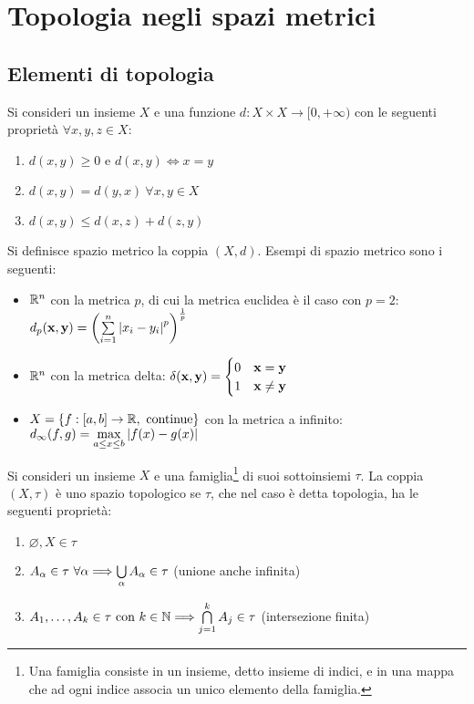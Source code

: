 \chapter{Topologia negli spazi metrici}\label{chap:topology}

\section{Elementi di topologia}

\begin{definition}\label{def:distance}
    Si consideri un insieme $X$ e una funzione $d: X\times X \to [0, +\infty)$ con le seguenti proprietà $\forall x,y,z \in X$:
    \begin{enumerate}
        \item $d(x,y) \geq 0$ e $d(x,y) \iff  x = y$
        \item $d(x,y) = d(y,x) \  \forall x, y \in X$
        \item $d(x,y) \leq d(x,z) + d(z,y)$
    \end{enumerate}
    Si definisce spazio metrico la coppia $(X, d)$. Esempi di spazio metrico sono i seguenti:
    \begin{itemize}
        \item $\mathbb{R}^n$ con la metrica $p$, di cui la metrica euclidea è il caso con $p=2$: $d_p(\vb{x},\vb{y})=\left(\sum\limits_{i=1}^n \abs{x_i-y_i}^p\right)^{\frac{1}{p}}$
        \item $\mathbb{R}^n$ con la metrica delta: $\delta(\vb{x},\vb{y})=\begin{cases}
            0 &\vb{x}=\vb{y}\\
            1 &\vb{x}\neq\vb{y}
        \end{cases}$
        \item $X=\{f:[a,b]\to\mathbb{R}, \text{ continue}\}$ con la metrica a infinito: $d_\infty(f,g)=\max\limits_{a\leq x\leq b}\abs{f(x)-g(x)}$
    \end{itemize}
\end{definition}

\begin{definition}[Topologia]
    Si consideri un insieme $X$ e una famiglia\footnote{Una famiglia consiste in un insieme, detto insieme di indici, e in una mappa che ad ogni indice associa un unico elemento della famiglia.} di suoi sottoinsiemi $\tau$. La coppia $(X, \tau)$ è uno spazio topologico se $\tau$, che nel caso è detta topologia, ha le seguenti proprietà:
    \begin{enumerate}
        \item $\varnothing, X \in \tau$
        \item $A_{\alpha} \in \tau \ \forall \alpha \Longrightarrow \bigcup\limits_\alpha A_\alpha \in \tau$ (unione anche infinita)
        \item $A_1,\dots,A_k \in \tau \text{ con } k \in \mathbb{N} \Longrightarrow \bigcap\limits_{j=1}^k A_j \in \tau$ (intersezione finita)
    \end{enumerate}
\end{definition}

